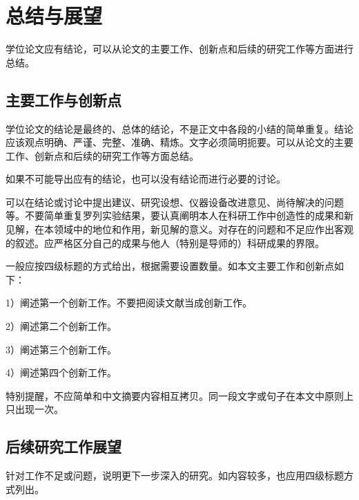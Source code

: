 \chapter{总结与展望}

学位论文应有结论，可以从论文的主要工作、创新点和后续的研究工作等方面进行总结。

\section{主要工作与创新点}

学位论文的结论是最终的、总体的结论，不是正文中各段的小结的简单重复。结论应该观点明确、严谨、完整、准确、精炼。文字必须简明扼要。可以从论文的主要工作、创新点和后续的研究工作等方面总结。

如果不可能导出应有的结论，也可以没有结论而进行必要的讨论。

可以在结论或讨论中提出建议、研究设想、仪器设备改进意见、尚待解决的问题等。不要简单重复罗列实验结果，要认真阐明本人在科研工作中创造性的成果和新见解，在本领域中的地位和作用，新见解的意义。对存在的问题和不足应作出客观的叙述。应严格区分自己的成果与他人（特别是导师的）科研成果的界限。

一般应按四级标题的方式给出，根据需要设置数量。如本文主要工作和创新点如下：

1）阐述第一个创新工作。不要把阅读文献当成创新工作。

2）阐述第二个创新工作。

3）阐述第三个创新工作。

4）阐述第四个创新工作。

特别提醒，不应简单和中文摘要内容相互拷贝。同一段文字或句子在本文中原则上只出现一次。

\section{后续研究工作展望}

针对工作不足或问题，说明更下一步深入的研究。如内容较多，也应用四级标题方式列出。